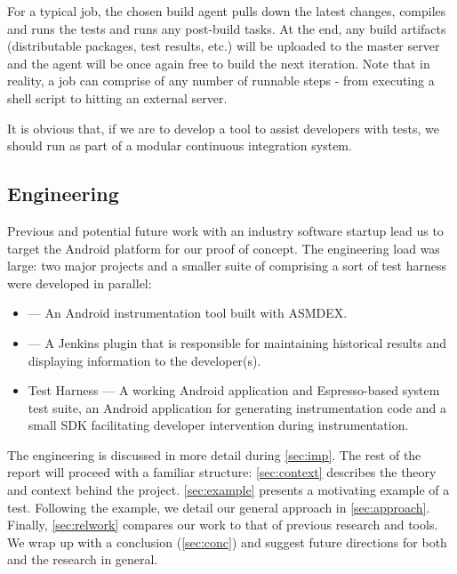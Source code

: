 For a typical job, the chosen build agent pulls down the latest changes,
compiles and runs the tests and runs any post-build tasks. At the end, any build
artifacts (distributable packages, test results, etc.) will be uploaded to the
master server and the agent will be once again free to build the next iteration.
Note that in reality, a job can comprise of any number of runnable steps - from
executing a shell script to hitting an external server.

It is obvious that, if we are to develop a tool to assist developers with \flaky
tests, we should run as part of a modular continuous integration system.


\subsection{Engineering}

Previous and potential future work with an industry software startup lead us to
target the Android platform for our proof of concept. The engineering load was
large: two major projects and a smaller suite of comprising a sort of test
harness were developed in parallel:

\begin{itemize}
	\item \venera --- An Android instrumentation tool built with ASMDEX.
	\item \jenkinsPlugin --- A Jenkins plugin that is responsible for maintaining
	historical results and displaying information to the developer(s).
	\item Test Harness --- A working Android application and
	Espresso-based system test suite, an Android application for generating
	instrumentation code and a small SDK facilitating developer intervention
	during instrumentation.
\end{itemize}

The engineering is discussed in more detail during \autoref{sec:imp}. The rest
of the report will proceed with a familiar structure: \autoref{sec:context}
describes the theory and context behind the project. \autoref{sec:example}
presents a motivating example of a \flaky test. Following the example, we detail
our general approach in \autoref{sec:approach}. Finally, \autoref{sec:relwork}
compares our work to that of previous research and tools. We wrap up with a
conclusion (\autoref{sec:conc}) and suggest future directions for both \venera
and the research in general.
